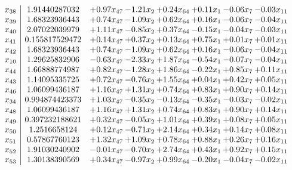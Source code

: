 \documentclass[8pt]{article}
\begin{document}
\[\begin{array}{c| c c@{\hskip 2pt} c@{\hskip 2pt} c@{\hskip 2pt} c@{\hskip 2pt} c@{\hskip 2pt} c@{\hskip 2pt} }
 x_{38}   &  1.91440287032 & +  0.97 x_{47} & -1.21 x_{2} & +  0.24 x_{64} & +  0.11 x_{1} & -0.06 x_{7} & -0.03 x_{11}\\
 x_{39}   &  1.68323936443 & +  0.74 x_{47} & -1.09 x_{2} & +  0.62 x_{64} & +  0.16 x_{1} & -0.06 x_{7} & -0.04 x_{11}\\
 x_{40}   &  2.07022039979 & +  1.11 x_{47} & -0.85 x_{2} & +  0.37 x_{64} & -0.15 x_{1} & -0.04 x_{7} & -0.03 x_{11}\\
 x_{41}   &  0.155817529472 & +  0.14 x_{47} & +  0.37 x_{2} & +  0.13 x_{64} & +  0.75 x_{1} & +  0.01 x_{7} & +  0.01 x_{11}\\
 x_{42}   &  1.68323936443 & +  0.74 x_{47} & -1.09 x_{2} & +  0.62 x_{64} & +  0.16 x_{1} & -0.06 x_{7} & -0.04 x_{11}\\
 x_{10}   &  1.29625832906 & -0.63 x_{47} & -2.33 x_{2} & +  1.87 x_{64} & -0.54 x_{1} & -0.07 x_{7} & -0.04 x_{11}\\
 x_{44}   &  1.66888774987 & +  0.82 x_{47} & -1.28 x_{2} & +  1.86 x_{64} & -0.22 x_{1} & +  0.85 x_{7} & +  0.11 x_{11}\\
 x_{43}   &  1.14095335725 & +  0.72 x_{47} & -0.76 x_{2} & +  1.55 x_{64} & +  0.04 x_{1} & +  0.42 x_{7} & +  0.05 x_{11}\\
 x_{46}   &  1.06099436187 & +  1.16 x_{47} & +  1.31 x_{2} & +  0.74 x_{64} & +  0.83 x_{1} & +  0.90 x_{7} & +  0.14 x_{11}\\
 x_{34}   &  0.994874423373 & +  1.03 x_{47} & -0.35 x_{2} & -0.13 x_{64} & -0.35 x_{1} & -0.03 x_{7} & -0.02 x_{11}\\
 x_{48}   &  1.06099436187 & +  1.16 x_{47} & +  1.31 x_{2} & +  0.74 x_{64} & +  0.83 x_{1} & +  0.90 x_{7} & +  0.14 x_{11}\\
 x_{49}   &  0.397232188621 & +  0.32 x_{47} & -0.05 x_{2} & +  1.01 x_{64} & +  0.39 x_{1} & +  0.08 x_{7} & +  0.05 x_{11}\\
 x_{50}   &  1.2516658124 & +  0.12 x_{47} & -0.71 x_{2} & +  2.14 x_{64} & +  0.34 x_{1} & +  0.14 x_{7} & +  0.08 x_{11}\\
 x_{51}   &  0.57867760123 & +  1.32 x_{47} & +  1.09 x_{2} & +  0.78 x_{64} & +  0.88 x_{1} & +  0.26 x_{7} & +  0.16 x_{11}\\
 x_{52}   &  1.91030240902 & -0.01 x_{47} & -0.70 x_{2} & +  2.74 x_{64} & +  0.43 x_{1} & +  0.92 x_{7} & +  0.15 x_{11}\\
 x_{53}   &  1.30138390569 & +  0.34 x_{47} & -0.97 x_{2} & +  0.99 x_{64} & -0.20 x_{1} & -0.04 x_{7} & -0.02 x_{11}\\

\end{array}\]
\end{document}
